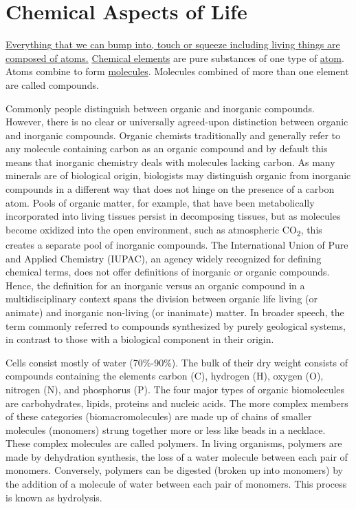 \chapter{Chemical Aspects of Life}\label{chemical-aspects-of-life}

\href{https://en.wikipedia.org/wiki/Matter}{Everything that we can bump
into, touch or squeeze including living things are composed of atoms.}
\href{https://en.wikipedia.org/wiki/Chemical_element}{Chemical elements}
are pure substances of one type of
\href{https://en.wikipedia.org/wiki/Atom}{atom}. Atoms combine to form
\href{https://en.wikipedia.org/wiki/Molecule}{molecules}. Molecules
combined of more than one element are called compounds.

Commonly people distinguish between organic and inorganic compounds.
However, there is no clear or universally agreed-upon distinction
between organic and inorganic compounds. Organic chemists traditionally
and generally refer to any molecule containing carbon as an organic
compound and by default this means that inorganic chemistry deals with
molecules lacking carbon. As many minerals are of biological origin,
biologists may distinguish organic from inorganic compounds in a
different way that does not hinge on the presence of a carbon atom.
Pools of organic matter, for example, that have been metabolically
incorporated into living tissues persist in decomposing tissues, but as
molecules become oxidized into the open environment, such as atmospheric
CO\textsubscript{2}, this creates a separate pool of inorganic
compounds. The International Union of Pure and Applied Chemistry
(IUPAC), an agency widely recognized for defining chemical terms, does
not offer definitions of inorganic or organic compounds. Hence, the
definition for an inorganic versus an organic compound in a
multidisciplinary context spans the division between organic life living
(or animate) and inorganic non-living (or inanimate) matter. In broader
speech, the term commonly referred to compounds synthesized by purely
geological systems, in contrast to those with a biological component in
their origin.

Cells consist mostly of water (70\%-90\%). The bulk of their dry weight
consists of compounds containing the elements carbon (C), hydrogen (H),
oxygen (O), nitrogen (N), and phosphorus (P). The four major types of
organic biomolecules are carbohydrates, lipids, proteins and nucleic
acids. The more complex members of these categories (biomacromolecules)
are made up of chains of smaller molecules (monomers) strung together
more or less like beads in a necklace. These complex molecules are
called polymers. In living organisms, polymers are made by dehydration
synthesis, the loss of a water molecule between each pair of monomers.
Conversely, polymers can be digested (broken up into monomers) by the
addition of a molecule of water between each pair of monomers. This
process is known as hydrolysis.

